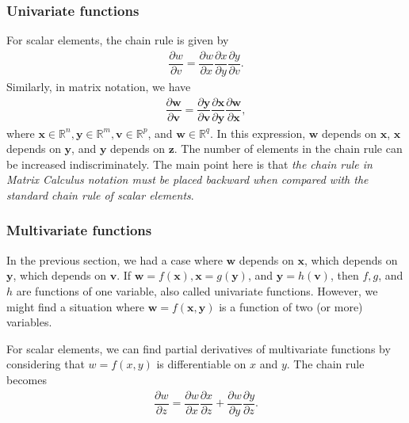 \documentclass{article}
\begin{document}
\subsubsection{Univariate functions}
For scalar elements, the chain rule is given by
\begin{align}
    \dfrac{\partial w}{\partial v} = \dfrac{\partial w}{\partial x} \dfrac{\partial x}{\partial y} \dfrac{\partial y}{\partial v}.
\end{align}
Similarly, in matrix notation, we have
\begin{align}
    \label{eq:chain-1inter}
    \dfrac{\partial \mathbf{w}}{\partial \mathbf{v}} = \dfrac{\partial \mathbf{y}}{\partial \mathbf{v}} \dfrac{\partial \mathbf{x}}{\partial \mathbf{y}} \dfrac{\partial \mathbf{w}}{\partial \mathbf{x}},
\end{align}
where \(\mathbf{x} \in \mathbb{R}^{n}, \mathbf{y} \in \mathbb{R}^{m}, \mathbf{v} \in \mathbb{R}^{p}\), and \(\mathbf{w} \in \mathbb{R}^q\). In this expression, \(\mathbf{w}\) depends on \(\mathbf{x}\), \(\mathbf{x}\) depends on \(\mathbf{y}\), and \(\mathbf{y}\) depends on \(\mathbf{z}\). The number of elements in the chain rule can be increased indiscriminately. The main point here is that \emph{the chain rule in Matrix Calculus notation must be placed backward when compared with the standard chain rule of scalar elements}.

\subsubsection{Multivariate functions}

In the previous section, we had a case where \(\mathbf{w}\) depends on \(\mathbf{x}\), which depends on \(\mathbf{y}\), which depends on \(\mathbf{v}\). If \(\mathbf{w} = f(\mathbf{x}), \mathbf{x} = g(\mathbf{y})\), and \(\mathbf{y} = h(\mathbf{v})\), then \(f, g\), and \(h\) are functions of one variable, also called univariate functions. However, we might find a situation where \(\mathbf{w} = f(\mathbf{x}, \mathbf{y})\) is a function of two (or more) variables.

For scalar elements, we can find partial derivatives of multivariate functions by considering that \(w = f(x, y)\) is differentiable on \(x\) and \(y\). The chain rule becomes
\begin{align}
    \dfrac{\partial w}{\partial z} = \dfrac{\partial w}{\partial x} \dfrac{\partial x}{\partial z} + \dfrac{\partial w}{\partial y} \dfrac{\partial y}{\partial z}.
\end{align}
\end{document}
